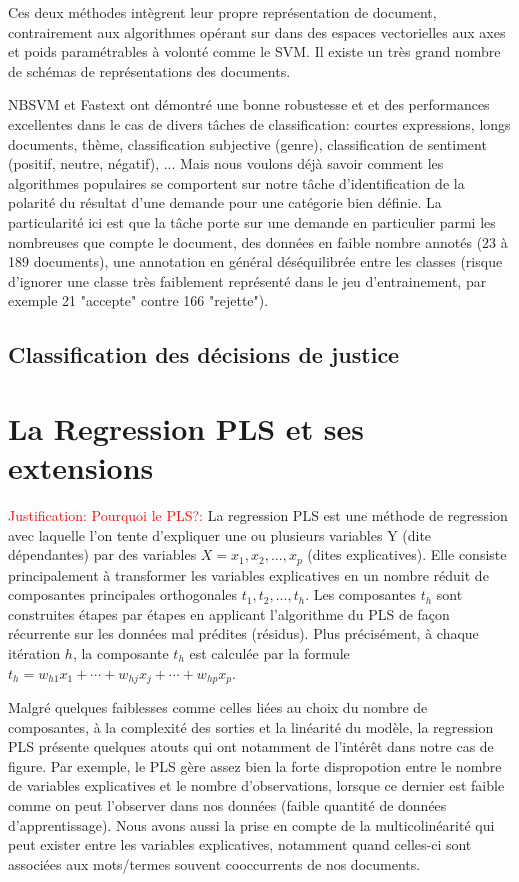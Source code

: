 Ces deux méthodes intègrent leur propre représentation de document, contrairement aux algorithmes opérant sur dans des espaces vectorielles aux axes et poids paramétrables à volonté comme le SVM. Il existe un très grand nombre de schémas de représentations des documents.

NBSVM et Fastext ont démontré une bonne robustesse et et des performances excellentes dans le cas de divers tâches de classification: courtes expressions, longs documents, thème, classification subjective (genre), classification de sentiment (positif, neutre, négatif), ... Mais nous voulons déjà savoir comment les algorithmes populaires se comportent sur notre tâche d'identification de la polarité du résultat d'une demande pour une catégorie bien définie. La particularité ici est que la tâche porte sur une demande en particulier parmi les nombreuses que compte le document, des données en faible nombre annotés (23 à 189 documents), une annotation en général déséquilibrée entre les classes (risque d'ignorer une classe très faiblement représenté dans le jeu d'entrainement, par exemple 21 "accepte" contre 166 "rejette").

\subsection{Classification des décisions de justice}

\section{La Regression PLS et ses extensions}
\label{sec:sensresultat:pls}
\textcolor{red}{Justification: Pourquoi le PLS?:}
La regression PLS est une méthode de regression avec laquelle l'on tente d'expliquer une ou plusieurs variables Y (dite dépendantes) par des variables $X=x_1,x_2,...,x_p$ (dites explicatives). Elle consiste principalement à transformer les variables explicatives en un nombre réduit de composantes principales orthogonales $t_1, t_2, ..., t_h$. Les composantes $t_h$ sont construites étapes par étapes en applicant l'algorithme du PLS de façon récurrente sur les données mal prédites (résidus). Plus précisément, à chaque itération $h$, la composante $t_h$ est calculée par la formule $t_h = w_{h1} x_1 + \cdots + w_{hj} x_j + \cdots + w_{hp} x_p$. 

Malgré quelques faiblesses comme celles liées au choix du nombre de composantes, à la complexité des sorties et la linéarité du modèle, la regression PLS présente quelques atouts qui ont notamment de l'intérêt dans notre cas de figure. Par exemple, le PLS gère assez bien la forte dispropotion entre le nombre de variables explicatives et le nombre d'observations, lorsque ce dernier est faible comme on peut l'observer dans nos données (faible quantité de données d'apprentissage). Nous avons aussi la prise en compte de la multicolinéarité qui peut exister entre les variables explicatives, notamment quand celles-ci sont associées aux mots/termes souvent cooccurrents de nos documents.

